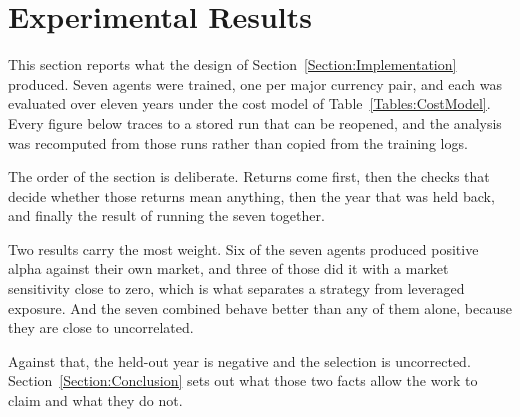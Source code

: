 \section{Experimental Results}
\label{Section:ExperimentalResults}

This section reports what the design of Section~\ref{Section:Implementation} produced. Seven agents were trained, one per major currency pair, and each was evaluated over eleven years under the cost model of Table~\ref{Tables:CostModel}. Every figure below traces to a stored run that can be reopened, and the analysis was recomputed from those runs rather than copied from the training logs.

The order of the section is deliberate. Returns come first, then the checks that decide whether those returns mean anything, then the year that was held back, and finally the result of running the seven together.





















Two results carry the most weight. Six of the seven agents produced positive alpha against their own market, and three of those did it with a market sensitivity close to zero, which is what separates a strategy from leveraged exposure. And the seven combined behave better than any of them alone, because they are close to uncorrelated.

Against that, the held-out year is negative and the selection is uncorrected. Section~\ref{Section:Conclusion} sets out what those two facts allow the work to claim and what they do not.